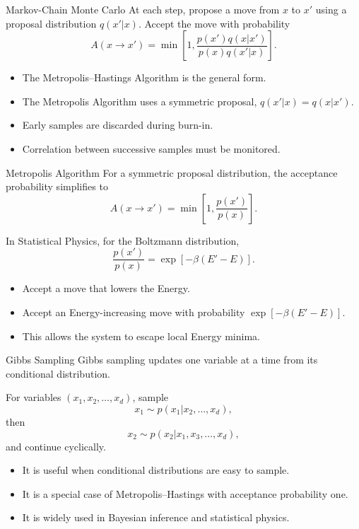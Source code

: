 \documentclass[a4paper, 10pt, onepage]{elegantbook}
\begin{document}
{\begin{frame}{Markov-Chain Monte Carlo}
  At each step, propose a move from \(x\) to \(x'\) using a proposal distribution \(q(x'|x)\). Accept the move with 
probability
  \[
    A(x\to x')
    =
    \min\left[
      1,
      \frac{p(x')q(x|x')}{p(x)q(x'|x)}
    \right].
  \]

  \begin{itemize}
    \item The Metropolis--Hastings Algorithm is the general form.
    \item The Metropolis Algorithm uses a symmetric proposal, \(q(x'|x)=q(x|x')\).
    \item Early samples are discarded during burn-in.
    \item Correlation between successive samples must be monitored.
  \end{itemize}
\end{frame}

\begin{frame}{Metropolis Algorithm}
  For a symmetric proposal distribution, the acceptance probability simplifies to
  \[
    A(x\to x')
    =
    \min\left[
      1,
      \frac{p(x')}{p(x)}
    \right].
  \]

  In Statistical Physics, for the Boltzmann distribution,
  \[
    \frac{p(x')}{p(x)}
    =
    \exp[-\beta(E'-E)].
  \]

  \begin{itemize}
    \item Accept a move that lowers the Energy.
    \item Accept an Energy-increasing move with probability \(\exp[-\beta(E'-E)]\).
    \item This allows the system to escape local Energy minima.
  \end{itemize}
\end{frame}

\begin{frame}{Gibbs Sampling}
  Gibbs sampling updates one variable at a time from its conditional distribution.

  For variables \((x_1,x_2,\ldots,x_d)\), sample
  \[
    x_1\sim p(x_1|x_2,\ldots,x_d),
  \]
  then
  \[
    x_2\sim p(x_2|x_1,x_3,\ldots,x_d),
  \]
  and continue cyclically.

  \begin{itemize}
    \item It is useful when conditional distributions are easy to sample.
    \item It is a special case of Metropolis--Hastings with acceptance probability one.
    \item It is widely used in Bayesian inference and statistical physics.
  \end{itemize}
\end{frame}

}
\end{document}
